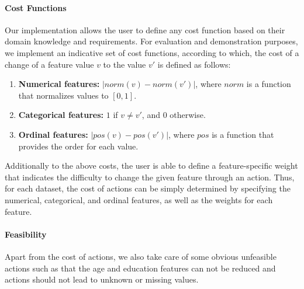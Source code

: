 \documentclass{article}
\begin{document}


\paragraph{Cost Functions} Our implementation allows the user to define any cost function based on their domain knowledge and requirements.
For evaluation and demonstration purposes, we implement an indicative set of cost functions, according to which,
the cost of a change of a feature value $v$ to the value $v'$ is defined as follows:
\begin{enumerate}
    \item \textbf{Numerical features:} $|norm(v)-norm(v')|$, where $norm$ is a function that normalizes values to $[0,1]$.
    \item \textbf{Categorical features:} $1$ if $v \neq v'$, and $0$ otherwise.
    \item \textbf{Ordinal features:} $|pos(v)-pos(v')|$, where $pos$ is a function that provides the order for each value.
\end{enumerate}
Additionally to the above costs, the user is able to define a feature-specific weight that indicates the difficulty to change the given feature through an action. Thus, for each dataset, the cost of actions can be simply determined by specifying the numerical, categorical, and ordinal features, as well as the weights for each feature.

\paragraph{Feasibility} Apart from the cost of actions, we also take care of some obvious unfeasible actions such as that the age and education features can not be reduced and actions should not lead to unknown or missing values.
\end{document}
